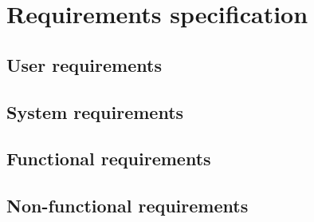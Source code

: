 \chapter{Requirements specification}
\section{User requirements}
\section{System requirements}
\section{Functional requirements}
\section{Non-functional requirements}